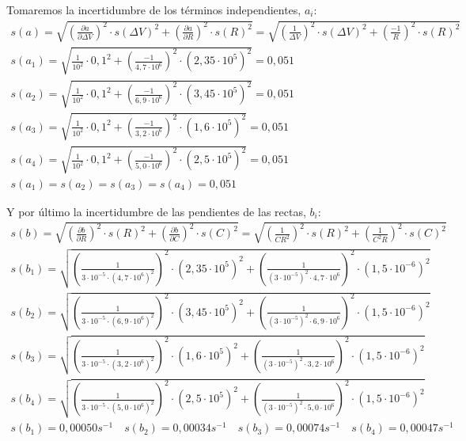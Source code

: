 \documentclass[12pt, a4paper, titlepage]{article}
\begin{document}
  Tomaremos la incertidumbre de los términos independientes, $a_i$:
  \begin{gather}
    s(a) = \sqrt{\left(\frac{\partial a}{\partial \Delta V}\right)^2 \cdot s(\Delta V)^2 + \left(\frac{\partial a}{\partial R}\right)^2 \cdot s(R)^2} = \sqrt{\left(\frac{1}{\Delta V}\right)^2 \cdot s(\Delta V)^2 + \left(\frac{-1}{R}\right)^2 \cdot s(R)^2} \label{ec:sateo} \\
    s(a_1) = \sqrt{\frac{1}{10^2} \cdot 0,1^2 + \left(\frac{-1}{4,7 \cdot 10^6}\right)^2 \cdot (2,35 \cdot 10^5)^2} = 0,051 \nonumber \\
    s(a_2) = \sqrt{\frac{1}{10^2} \cdot 0,1^2 + \left(\frac{-1}{6,9 \cdot 10^6}\right)^2 \cdot (3,45 \cdot 10^5)^2} = 0,051 \nonumber \\
    s(a_3) = \sqrt{\frac{1}{10^2} \cdot 0,1^2 + \left(\frac{-1}{3,2 \cdot 10^6}\right)^2 \cdot (1,6 \cdot 10^5)^2} = 0,051 \nonumber \\
    s(a_4) = \sqrt{\frac{1}{10^2} \cdot 0,1^2 + \left(\frac{-1}{5,0 \cdot 10^6}\right)^2 \cdot (2,5 \cdot 10^5)^2} = 0,051 \nonumber \\
    s(a_1) = s(a_2) = s(a_3) = s(a_4) = 0,051 \nonumber
  \end{gather}

  Y por último la incertidumbre de las pendientes de las rectas, $b_i$:
  \begin{gather}
    s(b) = \sqrt{\left(\frac{\partial b}{\partial R}\right)^2 \cdot s(R)^2 + \left(\frac{\partial b}{\partial C}\right)^2 \cdot s(C)^2} = \sqrt{\left(\frac{1}{C R^2}\right)^2 \cdot s(R)^2 + \left(\frac{1}{C^2 R}\right)^2 \cdot s(C)^2} \label{ec:sbteo} \\
    s(b_1) = \sqrt{\left(\frac{1}{3 \cdot 10^{-5} \cdot (4,7 \cdot 10^6)^2}\right)^2 \cdot (2,35 \cdot 10^5)^2 + \left(\frac{1}{(3 \cdot 10^{-5})^2 \cdot 4,7 \cdot 10^6}\right)^2 \cdot (1,5 \cdot 10^{-6})^2} \nonumber \\
    s(b_2) = \sqrt{\left(\frac{1}{3 \cdot 10^{-5} \cdot (6,9 \cdot 10^6)^2}\right)^2 \cdot (3,45 \cdot 10^5)^2 + \left(\frac{1}{(3 \cdot 10^{-5})^2 \cdot 6,9 \cdot 10^6}\right)^2 \cdot (1,5 \cdot 10^{-6})^2} \nonumber \\
    s(b_3) = \sqrt{\left(\frac{1}{3 \cdot 10^{-5} \cdot (3,2 \cdot 10^6)^2}\right)^2 \cdot (1,6 \cdot 10^5)^2 + \left(\frac{1}{(3 \cdot 10^{-5})^2 \cdot 3,2 \cdot 10^6}\right)^2 \cdot (1,5 \cdot 10^{-6})^2} \nonumber \\
    s(b_4) = \sqrt{\left(\frac{1}{3 \cdot 10^{-5} \cdot (5,0 \cdot 10^6)^2}\right)^2 \cdot (2,5 \cdot 10^5)^2 + \left(\frac{1}{(3 \cdot 10^{-5})^2 \cdot 5,0 \cdot 10^6}\right)^2 \cdot (1,5 \cdot 10^{-6})^2} \nonumber \\
    s(b_1) = 0,00050 s^{-1} \quad s(b_2) = 0,00034 s^{-1} \quad s(b_3) = 0,00074 s^{-1} \quad s(b_4) = 0,00047 s^{-1} \nonumber
  \end{gather}
\end{document}
